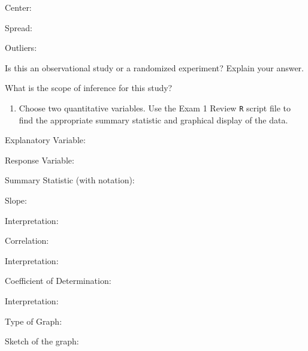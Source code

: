 \documentclass[
]{report}
\providecommand{\tightlist}{%
  \setlength{\itemsep}{0pt}\setlength{\parskip}{0pt}}
\newcommand{\rgi}{\hspace{24pt}}  %
\begin{document}
\rgi \rgi Center:

\vspace{0.2in}

\rgi \rgi Spread:

\vspace{0.2in}

\rgi \rgi Outliers:

\vspace{0.2in}

\rgi Is this an observational study or a randomized experiment? Explain your answer.

\vspace{0.5in}

\rgi What is the scope of inference for this study?

\newpage

\begin{enumerate}
\def\labelenumi{\arabic{enumi}.}
\setcounter{enumi}{7}
\tightlist
\item
  Choose two quantitative variables. Use the Exam 1 Review \texttt{R} script file to find the appropriate summary statistic and graphical display of the data.
\end{enumerate}

\rgi Explanatory Variable:

\rgi Response Variable:

\rgi Summary Statistic (with notation):

\rgi Slope:

\vspace{0.2in}

\rgi \rgi Interpretation:

\vspace{0.3in}

\rgi Correlation:

\vspace{0.2in}

\rgi \rgi Interpretation:

\vspace{0.3in}

\rgi Coefficient of Determination:

\vspace{0.2in}

\rgi \rgi Interpretation:

\vspace{0.3in}

\rgi Type of Graph:

\vspace{0.3in}

\rgi Sketch of the graph:
\end{document}
